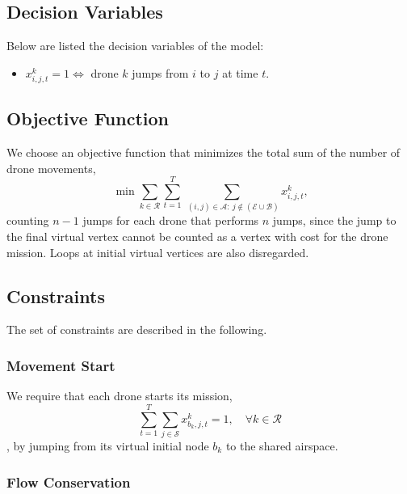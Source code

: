 \subsection{Decision Variables}

Below are listed the decision variables of the model:

\begin{itemize}
\item $x_{i,j,t}^k = 1 \iff$ drone $k$ jumps from $i$ to $j$ at time $t$.
\end{itemize}


\subsection{Objective Function}

We choose an objective function that minimizes the total sum of the number of drone movements,
\begin{equation}\label{eq:fobj}
\min
\sum_{k \in \mathcal{R}}
\sum_{t=1}^T
\sum_{ \; (i,j) \in \mathcal{A}:\ j \notin (\mathcal{E} \cup \mathcal{B})} x_{i,j,t}^{k}\text{,}
\end{equation}
counting $n-1$ jumps for each drone that performs $n$ jumps, since the jump to the final virtual vertex cannot be counted as a vertex with cost for the drone mission. Loops at initial virtual vertices are also disregarded.

\subsection{Constraints}

The set of constraints are described in the following.

\subsubsection{Movement Start}

We require that each drone starts its mission, \begin{equation}\label{eq:restr_inicio}
\sum_{t=1}^{T}
\sum_{j \in \mathcal{S}}
x_{b_k,j,t}^k = 1, \quad \forall k \in \mathcal{R}
\end{equation},  by jumping from its virtual initial node $b_k$ to the shared airspace.

\subsubsection{Flow Conservation}

